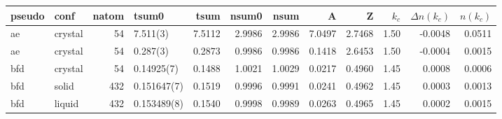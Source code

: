\begin{tabular}{llrlrrrrrrrr}
\toprule
pseudo &     conf &  natom &          tsum0 &    tsum &   nsum0 &    nsum &       A &       Z &  $k_c$ &  $\Delta n(k_c)$ &  $n(k_c)$ \\
\midrule
    ae &  crystal &     54 &       7.511(3) &  7.5112 &  2.9986 &  2.9986 &  7.0497 &  2.7468 &   1.50 &          -0.0048 &    0.0511 \\
    ae &  crystal &     54 &       0.287(3) &  0.2873 &  0.9986 &  0.9986 &  0.1418 &  2.6453 &   1.50 &          -0.0004 &    0.0015 \\
   bfd &  crystal &     54 &     0.14925(7) &  0.1488 &  1.0021 &  1.0029 &  0.0217 &  0.4960 &   1.45 &           0.0008 &    0.0006 \\
   bfd &    solid &    432 &    0.151647(7) &  0.1519 &  0.9996 &  0.9991 &  0.0241 &  0.4962 &   1.45 &           0.0003 &    0.0013 \\
   bfd &   liquid &    432 &    0.153489(8) &  0.1540 &  0.9998 &  0.9989 &  0.0263 &  0.4965 &   1.45 &           0.0002 &    0.0015 \\
\bottomrule
\end{tabular}
